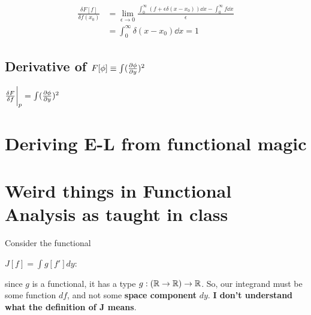 \begin{align*}
    \frac{\delta F[f]}{\delta f (x_0)} &=
        \lim_{\epsilon \to 0} 
         \frac{\int_0^\infty (f + \epsilon \delta (x - x_0)) \dd x- \int_0^\infty f \dd x }{\epsilon} \\
         &= \int_0^\infty \delta(x - x_0) \dd x = 1
\end{align*}

\subsection{Derivative of $F[\phi] \equiv \int (\pdv{\phi}{y})^2$}

$\fdv{F}{f}{\bigg \rvert_p} = \int (\pdv{\phi}{y})^2$


\section{Deriving E-L from functional magic}

\section{Weird things in Functional Analysis as taught in class}

Consider the functional

$J[f] = \int g[f'] dy$:

since $g$ is a functional, it has a type $g: (\mathbb{R} \to \mathbb{R}) \to \mathbb{R}$.
So, our integrand must be some function $df$, and not some
\textbf{space component} $dy$. \textbf{I don't understand what the definition of J means}.

